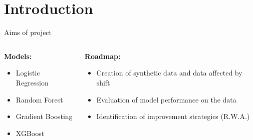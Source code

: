 
%  




\section{Introduction}


\begin{frame}{Aims of project}
	\begin{columns} %
		\begin{column}{0.5\textwidth}
			\textbf{Models:}
			\begin{tcolorbox}[colframe=blue!50!black, colback=blue!5, coltitle=black, sharp corners]
				\begin{itemize}
					\item Logistic Regression
					\item Random Forest
					\item Gradient Boosting
					\item XGBoost
				\end{itemize}
			\end{tcolorbox}
		\end{column}
		
		\vspace{0.5cm}
		\begin{column}{0.5\textwidth}
			\textbf{Roadmap:}
			\begin{itemize}
				\item Creation of synthetic data and data affected by shift
				\item Evaluation of model performance on the data
				\item Identification of improvement strategies (R.W.A.)
			\end{itemize}
		\end{column}
	\end{columns} %
\end{frame}


